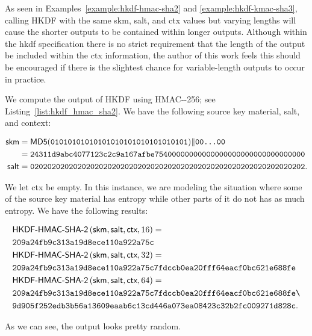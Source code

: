 As seen in Examples~\ref{example:hkdf-hmac-sha2} and
\ref{example:hkdf-kmac-sha3},
calling \textsf{HKDF} with the same
\textsf{skm}, \textsf{salt}, and \textsf{ctx} values
but varying lengths will cause the shorter outputs to be
contained within longer outputs.
Although within the \gls{hkdf} specification
there is no strict requirement that the length of the output
be included within the \textsf{ctx} information,
the author of this work feels this should be encouraged
if there is the slightest chance for variable-length outputs
to occur in practice.

\begin{example}
\label{example:hkdf-hmac-sha2}

We compute the output of HKDF using HMAC-\ShaTwo{}-256;
see Listing~\ref{list:hkdf_hmac_sha2}.
We have the following source key material, salt, and context:

\begin{align}
    \textsf{skm} &=
    \textsf{MD5{}}(
    \texttt{01010101010101010101010101010101})\|\texttt{00\dots00}
        \nonumber\\
    &= \texttt{24311d9abc4077123c2c9a167afbe75400000000000000000000000000000000}
        \nonumber\\
    \textsf{salt} &= 
    \texttt{0202020202020202020202020202020202020202020202020202020202020202}.
\end{align}

\noindent
We let \textsf{ctx} be empty.
In this instance, we are modeling the situation where
some of the source key material has entropy
while other parts of it do not has as much entropy.
We have the following results:

\begin{align}
    &\textsf{HKDF-HMAC-\ShaTwo{}}\parens{
        \textsf{skm},\textsf{salt},\textsf{ctx}, 16} = \nonumber\\
    &\texttt{209a24fb9c313a19d8ece110a922a75c}
        \nonumber\\
    &\textsf{HKDF-HMAC-\ShaTwo{}}\parens{
        \textsf{skm},\textsf{salt},\textsf{ctx}, 32} = \nonumber\\
    &\texttt{209a24fb9c313a19d8ece110a922a75c7fdccb0ea20fff64eacf0bc621e688fe}
        \nonumber\\
    &\textsf{HKDF-HMAC-\ShaTwo{}}\parens{
        \textsf{skm},\textsf{salt},\textsf{ctx}, 64} = \nonumber\\
    &\texttt{209a24fb9c313a19d8ece110a922a75c7fdccb0ea20fff64eacf0bc621e688fe\textbackslash}
        \nonumber\\
    &\texttt{9d905f252edb3b56a13609eaab6c13cd446a073ea08423c32b2fc009271d828c}.
\end{align}

\noindent
As we can see, the output looks pretty random.


\end{example}

